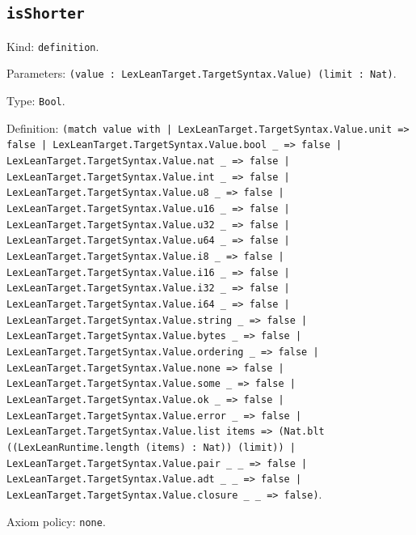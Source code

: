 \documentclass[11pt]{article}
\begin{document}
\subsection*{\texttt{isShorter}}
\noindent Kind: \texttt{definition}.\par
\noindent Parameters: \texttt{(value : LexLeanTarget.TargetSyntax.Value) (limit : Nat)}.\par
\noindent Type: \texttt{Bool}.\par
\noindent Definition: \texttt{(match value with | LexLeanTarget.TargetSyntax.Value.unit => false | LexLeanTarget.TargetSyntax.Value.bool \_ => false | LexLeanTarget.TargetSyntax.Value.nat \_ => false | LexLeanTarget.TargetSyntax.Value.int \_ => false | LexLeanTarget.TargetSyntax.Value.u8 \_ => false | LexLeanTarget.TargetSyntax.Value.u16 \_ => false | LexLeanTarget.TargetSyntax.Value.u32 \_ => false | LexLeanTarget.TargetSyntax.Value.u64 \_ => false | LexLeanTarget.TargetSyntax.Value.i8 \_ => false | LexLeanTarget.TargetSyntax.Value.i16 \_ => false | LexLeanTarget.TargetSyntax.Value.i32 \_ => false | LexLeanTarget.TargetSyntax.Value.i64 \_ => false | LexLeanTarget.TargetSyntax.Value.string \_ => false | LexLeanTarget.TargetSyntax.Value.bytes \_ => false | LexLeanTarget.TargetSyntax.Value.ordering \_ => false | LexLeanTarget.TargetSyntax.Value.none => false | LexLeanTarget.TargetSyntax.Value.some \_ => false | LexLeanTarget.TargetSyntax.Value.ok \_ => false | LexLeanTarget.TargetSyntax.Value.error \_ => false | LexLeanTarget.TargetSyntax.Value.list items => (Nat.blt ((LexLeanRuntime.length (items) : Nat)) (limit)) | LexLeanTarget.TargetSyntax.Value.pair \_ \_ => false | LexLeanTarget.TargetSyntax.Value.adt \_ \_ => false | LexLeanTarget.TargetSyntax.Value.closure \_ \_ => false)}.\par
\noindent Axiom policy: \texttt{none}.\par
\end{document}

